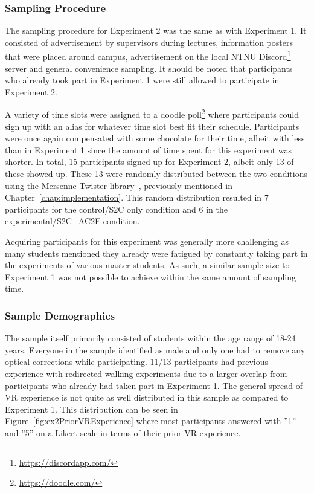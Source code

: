 \subsubsection{Sampling Procedure}
The sampling procedure for Experiment 2 was the same as with Experiment 1. It consisted of advertisement by supervisors during lectures, information posters that were placed around campus, advertisement on the local NTNU Discord\footnote{\url{https://discordapp.com/}} server and general convenience sampling. It should be noted that participants who already took part in Experiment 1 were still allowed to participate in Experiment 2.

A variety of time slots were assigned to a doodle poll\footnote{\url{https://doodle.com/}} where participants could sign up with an alias for whatever time slot best fit their schedule. Participants were once again compensated with some chocolate for their time, albeit with less than in Experiment 1 since the amount of time spent for this experiment was shorter. In total, 15 participants signed up for Experiment 2, albeit only 13 of these showed up. These 13 were randomly distributed between the two conditions using the Mersenne Twister library~\cite{MersenneTwisterLibraryLink},  previously mentioned in  Chapter~\ref{chap:implementation}. This random distribution resulted in 7 participants for the control/S2C only condition and 6 in the experimental/S2C+AC2F condition. 

Acquiring participants for this experiment was generally more challenging as many students mentioned they already were fatigued by constantly taking part in the experiments of various master students. As such, a similar sample size to Experiment 1 was not possible to achieve within the same amount of sampling time. 

\subsubsection{Sample Demographics}
The sample itself primarily consisted of students within the age range of 18-24 years. Everyone in the sample identified as male and only one had to remove any optical corrections while participating. 11/13 participants had previous experience with redirected walking experiments due to a larger overlap from participants who already had taken part in Experiment 1. The general spread of VR experience is not quite as well distributed in this sample as compared to Experiment 1. This distribution can be seen in Figure~\ref{fig:ex2PriorVRExperience} where most participants answered with ''1'' and ''5'' on a Likert scale in terms of their prior VR experience.

